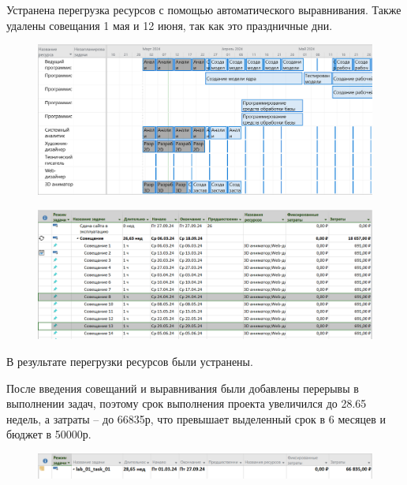 Устранена перегрузка ресурсов с помощью автоматического
выравнивания. Также удалены совещания 1 мая и 12 июня, так как это праздничные дни.

\begin{figure}[h!]
	\begin{center}
		\includegraphics[scale=0.47]{inc/img/p_8.png}
	\end{center}
	\captionsetup{justification=centering}
	\label{fig:u3}
\end{figure}

\begin{figure}[h!]
	\begin{center}
		\includegraphics[scale=0.45]{inc/img/p_9.png}
	\end{center}
	\captionsetup{justification=centering}
	\label{fig:u3}
\end{figure}

В результате перегрузки ресурсов были устранены.

После введения совещаний и выравнивания были добавлены перерывы
в выполнении задач, поэтому срок выполнения проекта увеличился до 28.65 недель, а затраты – до 66835р, что превышает выделенный срок в 6 месяцев и бюджет в 50000р. 

\begin{figure}[h!]
	\begin{center}
		\includegraphics[scale=0.45]{inc/img/p_10.png}
	\end{center}
	\captionsetup{justification=centering}
	\label{fig:u3}
\end{figure}

